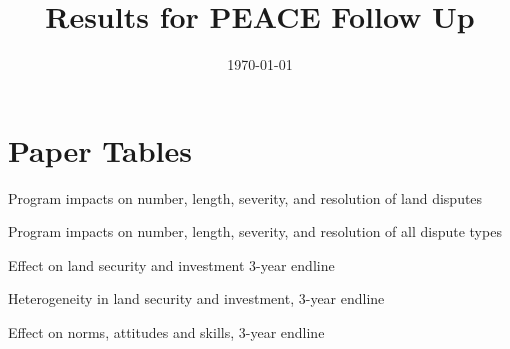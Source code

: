 \documentclass[10pt]{article}
\title{Results for PEACE Follow Up}
\date{\today}
\begin{document}
\maketitle 
\tableofcontents
\listoftables
\newpage
\clearpage


\section{Paper Tables}
\begin{table}[H]
\caption{ Program impacts on number, length, severity, and resolution of land disputes}
\begin{center}
\begin{adjustbox}{max width = \textwidth}

\end{adjustbox}
\end{center}
\end{table}

\begin{table}[H]
\caption{Program impacts on number, length, severity, and resolution of all dispute types}
\begin{center}
\begin{adjustbox}{max width = \textwidth}

\end{adjustbox}
\end{center}
\end{table}

\begin{table}[H]
\caption{Effect on land security and investment 3-year endline}
\begin{center}
\begin{adjustbox}{max width = \textwidth}

\end{adjustbox}
\end{center}
\end{table}

\begin{table}[H]
\caption{Heterogeneity in land security and investment, 3-year endline}
\begin{center}
\begin{adjustbox}{max width = \textwidth}

\end{adjustbox}
\end{center}
\end{table}

\begin{table}[H]
\caption{Effect on norms, attitudes and skills, 3-year endline}
\begin{center}
\begin{adjustbox}{max width = \textwidth}

\end{adjustbox}
\end{center}
\end{table}
\end{document}
